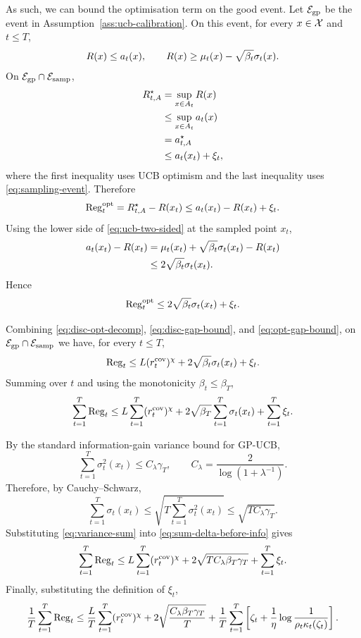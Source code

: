 As such, we can bound the optimisation term on the good event. Let $\mathcal E_{\rm gp}$ be the event in Assumption~\ref{ass:ucb-calibration}. On this event, for every
$x\in\mathcal{X}$ and $t\le T$,
\begin{equation}
\begin{aligned}
R(x)\le a_t(x),
\qquad
R(x)\ge \mu_t(x)-\sqrt{\beta_t}\sigma_t(x).
\end{aligned}
\label{eq:ucb-two-sided}
\end{equation}
On $\mathcal E_{\rm gp}\cap\mathcal E_{\rm samp}$,
\begin{align}
R_{t,A}^\star
&=
\sup_{x\in A_t}R(x) \notag\\
&\le
\sup_{x\in A_t}a_t(x) \notag\\
&=
a_{t,A}^\star \notag\\
&\le
a_t(x_t)+\xi_t,
\label{eq:best-in-a-upper}
\end{align}
where the first inequality uses UCB optimism and the last inequality uses \eqref{eq:sampling-event}. Therefore
\[
\mathrm{Reg}_t^{\rm opt}
=
R_{t,A}^\star-R(x_t)
\le
a_t(x_t)-R(x_t)+\xi_t.
\]
Using the lower side of \eqref{eq:ucb-two-sided} at the sampled point $x_t$,
\begin{align}
a_t(x_t)-R(x_t)
&=
\mu_t(x_t)+\sqrt{\beta_t}\sigma_t(x_t)-R(x_t) \notag\\
&\le
2\sqrt{\beta_t}\sigma_t(x_t).
\end{align}
Hence
\begin{equation}
\mathrm{Reg}_t^{\rm opt}
\le
2\sqrt{\beta_t}\sigma_t(x_t)+\xi_t.
\label{eq:opt-gap-bound}
\end{equation}

Combining \eqref{eq:disc-opt-decomp}, \eqref{eq:disc-gap-bound}, and \eqref{eq:opt-gap-bound}, on $\mathcal E_{\rm gp}\cap\mathcal E_{\rm samp}$ we have, for every $t\le T$,
\[
\mathrm{Reg}_t
\le
L(r_t^{\rm cov})^\chi
+
2\sqrt{\beta_t}\sigma_t(x_t)
+
\xi_t.
\]
Summing over $t$ and using the monotonicity $\beta_t\le\beta_T$,
\begin{equation}
\sum_{t=1}^T\mathrm{Reg}_t
\le
L\sum_{t=1}^T(r_t^{\rm cov})^\chi
+
2\sqrt{\beta_T}\sum_{t=1}^T\sigma_t(x_t)
+
\sum_{t=1}^T\xi_t.
\label{eq:sum-delta-before-info}
\end{equation}

By the standard information-gain variance bound for GP-UCB,
\[
\sum_{t=1}^T\sigma_t^2(x_t)
\le
C_\lambda\gamma_T,
\qquad
C_\lambda=\frac{2}{\log(1+\lambda^{-1})}.
\]
Therefore, by Cauchy--Schwarz,
\begin{equation}
\sum_{t=1}^T\sigma_t(x_t)
\le
\sqrt{T\sum_{t=1}^T\sigma_t^2(x_t)}
\le
\sqrt{T C_\lambda\gamma_T}.
\label{eq:variance-sum}
\end{equation}
Substituting \eqref{eq:variance-sum} into \eqref{eq:sum-delta-before-info} gives
\[
\sum_{t=1}^T\mathrm{Reg}_t
\le
L\sum_{t=1}^T(r_t^{\rm cov})^\chi
+
2\sqrt{T C_\lambda\beta_T\gamma_T}
+
\sum_{t=1}^T\xi_t.
\]
Finally, substituting the definition of $\xi_t$,
\[
\frac{1}{T}\sum_{t=1}^T \mathrm{Reg}_t
\le
\frac{L}{T}\sum_{t=1}^T(r_t^{\rm cov})^\chi
+
2\sqrt{\frac{C_\lambda\beta_T\gamma_T}{T}}
+
\frac1T\sum_{t=1}^T
\left[
\zeta_t+
\frac1\eta\log\frac1{\rho_t\kappa_t(\zeta_t)}
\right].
\]

